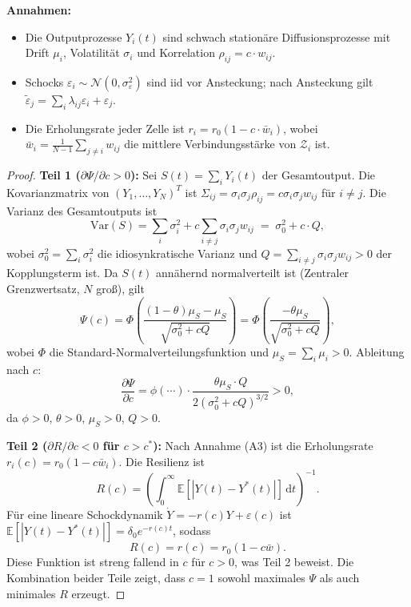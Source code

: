 \documentclass[a4paper, 12pt, twoside, openright]{report}
\theoremstyle{definition}
\theoremstyle{definition}
\begin{document}
\noindent\textbf{Annahmen:}
\begin{itemize}
    \item[(A1)] Die Outputprozesse $Y_i(t)$ sind schwach stationäre Diffusionsprozesse mit
          Drift $\mu_i$, Volatilität $\sigma_i$ und Korrelation $\rho_{ij} = c \cdot w_{ij}$.
    \item[(A2)] Schocks $\varepsilon_i \sim \mathcal{N}(0, \sigma_\varepsilon^2)$ sind
          iid vor Ansteckung; nach Ansteckung gilt
          $\tilde{\varepsilon}_j = \sum_i \lambda_{ij} \varepsilon_i + \varepsilon_j$.
    \item[(A3)] Die Erholungsrate jeder Zelle ist $r_i = r_0 (1 - c \cdot \bar{w}_i)$,
          wobei $\bar{w}_i = \frac{1}{N-1}\sum_{j\neq i} w_{ij}$ die mittlere
          Verbindungsstärke von $\mathcal{Z}_i$ ist.
\end{itemize}

\begin{proof}
    \textbf{Teil 1 ($\partial\Psi/\partial c > 0$):}
    Sei $S(t) = \sum_i Y_i(t)$ der Gesamtoutput. Die Kovarianzmatrix von
    $(Y_1,\ldots,Y_N)^T$ ist $\Sigma_{ij} = \sigma_i \sigma_j \rho_{ij} = c \sigma_i \sigma_j w_{ij}$
    für $i \neq j$. Die Varianz des Gesamtoutputs ist
    \[
        \mathrm{Var}(S) = \sum_i \sigma_i^2 + c \sum_{i\neq j} \sigma_i \sigma_j w_{ij}
        \;=\; \sigma_0^2 + c \cdot Q,
    \]
    wobei $\sigma_0^2 = \sum_i \sigma_i^2$ die idiosynkratische Varianz und
    $Q = \sum_{i\neq j} \sigma_i \sigma_j w_{ij} > 0$ der Kopplungsterm ist.
    Da $S(t)$ annähernd normalverteilt ist (Zentraler Grenzwertsatz, $N$ groß), gilt
    \[
        \Psi(c) = \Phi\!\left(\frac{(1-\theta)\mu_S - \mu_S}{\sqrt{\sigma_0^2 + c Q}}\right)
        = \Phi\!\left(\frac{-\theta\mu_S}{\sqrt{\sigma_0^2 + c Q}}\right),
    \]
    wobei $\Phi$ die Standard-Normalverteilungsfunktion und $\mu_S = \sum_i \mu_i > 0$.
    Ableitung nach $c$:
    \[
        \frac{\partial \Psi}{\partial c}
        = \phi\!\left(\cdots\right) \cdot \frac{\theta \mu_S \cdot Q}{2(\sigma_0^2 + cQ)^{3/2}}
        > 0,
    \]
    da $\phi > 0$, $\theta > 0$, $\mu_S > 0$, $Q > 0$.

    \textbf{Teil 2 ($\partial R/\partial c < 0$ für $c > c^*$):}
    Nach Annahme (A3) ist die Erholungsrate $r_i(c) = r_0(1-c\bar{w}_i)$. Die Resilienz ist
    \[
        R(c) = \left(\int_0^\infty \mathbb{E}[|Y(t) - Y^*(t)|]\,\mathrm{d}t\right)^{-1}.
    \]
    Für eine lineare Schockdynamik $\dot{Y} = -r(c) Y + \varepsilon(c)$ ist
    $\mathbb{E}[|Y(t)-Y^*(t)|] = \delta_0 e^{-r(c)t}$, sodass
    \[
        R(c) = r(c) = r_0(1 - c\bar{w}).
    \]
    Diese Funktion ist streng fallend in $c$ für $c > 0$, was Teil 2 beweist.
    Die Kombination beider Teile zeigt, dass $c=1$ sowohl maximales $\Psi$ als auch
    minimales $R$ erzeugt.
\end{proof}
\end{document}
